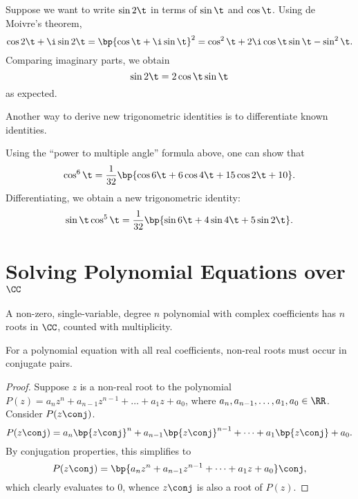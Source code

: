 \begin{example}
    Suppose we want to write $\sin 2\t$ in terms of $\sin \t$ and $\cos \t$. Using de Moivre's theorem, \[\cos 2\t + \i \sin 2\t = \bp{\cos \t + \i \sin \t}^2 = \cos^2 \t + 2\i \cos \t \sin \t - \sin^2 \t.\] Comparing imaginary parts, we obtain \[\sin 2\t = 2\cos\t\sin\t\] as expected.
\end{example}

Another way to derive new trigonometric identities is to differentiate known identities.

\begin{example}
    Using the ``power to multiple angle'' formula above, one can show that \[\cos^6 \t = \frac1{32} \bp{\cos 6\t + 6\cos4\t + 15\cos2\t + 10}.\] Differentiating, we obtain a new trigonometric identity: \[\sin \t \cos^5 \t = \frac1{32} \bp{\sin 6\t + 4\sin 4\t + 5\sin 2\t}.\]
\end{example}

\section{Solving Polynomial Equations over \texorpdfstring{$\CC$}{Complex Numbers}}

\begin{theorem}
    A non-zero, single-variable, degree $n$ polynomial with complex coefficients has $n$ roots in $\CC$, counted with multiplicity.
\end{theorem}

\begin{theorem}
    For a polynomial equation with all real coefficients, non-real roots must occur in conjugate pairs.
\end{theorem}
\begin{proof}
    Suppose $z$ is a non-real root to the polynomial $P(z) = a_n z^n + a_{n-1} z^{n-1} + \dots + a_1 z + a_0$, where $a_n, a_{n-1}, \dots, a_1, a_0 \in \RR$. Consider $P(z\conj)$. \[P(z\conj) = a_n \bp{z\conj}^n + a_{n-1} \bp{z\conj}^{n-1} + \dots + a_1 \bp{z\conj} + a_0.\] By conjugation properties, this simplifies to \[P(z\conj) = \bp{a_n z^n + a_{n-1} z^{n-1} + \dots + a_1 z + a_0}\conj,\] which clearly evaluates to 0, whence $z\conj$ is also a root of $P(z)$.
\end{proof}